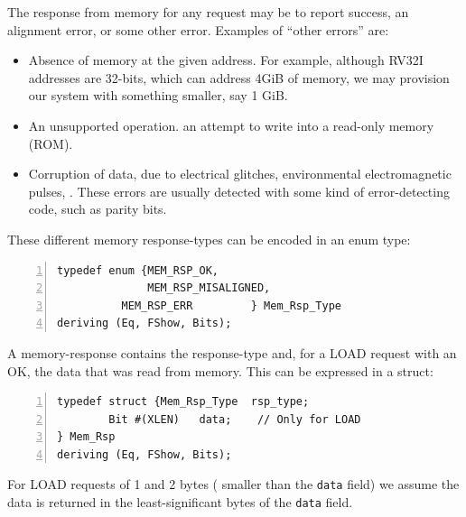 \label{Sec_Mem_Rsp}


The response from memory for any request may be to report success, an
alignment error, or some other error.  Examples of ``other errors''
are:

\begin{itemize}

\item Absence of memory at the given address.  For example, although
  RV32I addresses are 32-bits, which can address 4GiB of memory, we
  may provision our system with something smaller, say 1 GiB.

\item An unsupported operation. {\Eg} an attempt to write into a
  read-only memory (ROM).

\item Corruption of data, due to electrical glitches, environmental
  electromagnetic pulses, {\etc}.  These errors are usually detected
  with some kind of error-detecting code, such as parity bits.

\end{itemize}

These different memory response-types can be encoded in an enum type:

\begin{Verbatim}[frame=single, numbers=left]
typedef enum {MEM_RSP_OK,
              MEM_RSP_MISALIGNED,
	      MEM_RSP_ERR         } Mem_Rsp_Type
deriving (Eq, FShow, Bits);
\end{Verbatim}

A memory-response contains the response-type and, for a LOAD request
with an OK, the data that was read from memory.  This can be expressed
in a struct:

\begin{Verbatim}[frame=single, numbers=left]
typedef struct {Mem_Rsp_Type  rsp_type;
		Bit #(XLEN)   data;    // Only for LOAD
} Mem_Rsp
deriving (Eq, FShow, Bits);
\end{Verbatim}

For LOAD requests of 1 and 2 bytes ({\ie} smaller than the \verb|data|
field) we assume the data is returned in the least-significant bytes
of the \verb|data| field.


